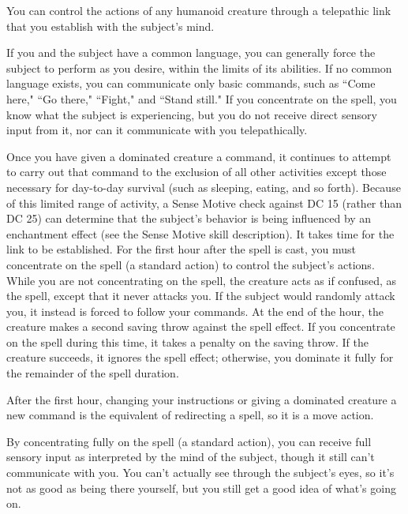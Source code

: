 \spellrng{\rngclose}
\begin{spelleffect}
  You can control the actions of any humanoid creature through a telepathic link that you establish with the subject's mind.
  \par If you and the subject have a common language, you can generally force the subject to perform as you desire, within the limits of its abilities. If no common language exists, you can communicate only basic commands, such as ``Come here," ``Go there," ``Fight," and ``Stand still." If you concentrate on the spell, you know what the subject is experiencing, but you do not receive direct sensory input from it, nor can it communicate with you telepathically.
  \par Once you have given a dominated creature a command, it continues to attempt to carry out that command to the exclusion of all other activities except those necessary for day-to-day survival (such as sleeping, eating, and so forth). Because of this limited range of activity, a Sense Motive check against DC 15 (rather than DC 25) can determine that the subject's behavior is being influenced by an enchantment effect (see the Sense Motive skill description).
  It takes time for the link to be established. For the first hour after the spell is cast, you must concentrate on the spell (a standard action) to control the subject's actions. While you are not concentrating on the spell, the creature acts as if confused, as the  spell, except that it never attacks you. If the subject would randomly attack you, it instead is forced to follow your commands. At the end of the hour, the creature makes a second saving throw against the spell effect. If you concentrate on the spell during this time, it takes a  penalty on the saving throw. If the creature succeeds, it ignores the spell effect; otherwise, you dominate it fully for the remainder of the spell duration.
  \par After the first hour, changing your instructions or giving a dominated creature a new command is the equivalent of redirecting a spell, so it is a move action.
  \par By concentrating fully on the spell (a standard action), you can receive full sensory input as interpreted by the mind of the subject, though it still can't communicate with you. You can't actually see through the subject's eyes, so it's not as good as being there yourself, but you still get a good idea of what's going on.

\end{spelleffect}

